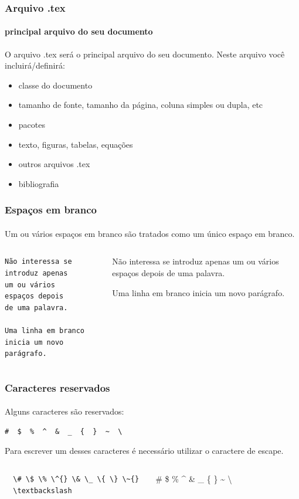 \begin{frame}
\frametitle{Arquivo .tex}
\framesubtitle{principal arquivo do seu documento}
O arquivo .tex será o principal arquivo do seu documento. Neste arquivo você incluirá/definirá:
\begin{itemize}
    \item classe do documento
    \item tamanho de fonte, tamanho da página, coluna simples ou dupla, etc
    \item pacotes
    \item texto, figuras, tabelas, equações
    \item outros arquivos .tex
    \item bibliografia
\end{itemize}
\end{frame}


\begin{frame}[fragile]
\frametitle{Espaços em branco}
\framesubtitle{}
  Um ou vários espaços em branco são tratados como um único espaço em branco.
  \scriptsize
  \begin{columns}[c]
  \begin{verbatim}
Não interessa se introduz apenas
um ou vários     espaços depois
de uma palavra.

Uma linha em branco inicia um novo
parágrafo. 
   \end{verbatim}
  \begin{fmpage}{\textwidth}
Não interessa se introduz apenas
um ou vários     espaços depois
de uma palavra.

Uma linha em branco inicia um novo
parágrafo.
   \end{fmpage}
   \end{columns}
\end{frame}


\begin{frame}[fragile]
\frametitle{Caracteres reservados}
\framesubtitle{}
Alguns caracteres são reservados:
\begin{verbatim}
#  $  %  ^  &  _  {  }  ~  \ 
\end{verbatim}

Para escrever um desses caracteres é necessário utilizar o caractere de escape.
  \vspace{1cm}
  \scriptsize
  \begin{columns}[c]
  \begin{verbatim}
  \# \$ \% \^{} \& \_ \{ \} \~{} 
  \textbackslash
   \end{verbatim}
  \begin{fmpage}{\textwidth}
  \# \$ \% \^{} \& \_ \{ \} \~{}
  \textbackslash
  \end{fmpage}
  \end{columns}
\end{frame}


